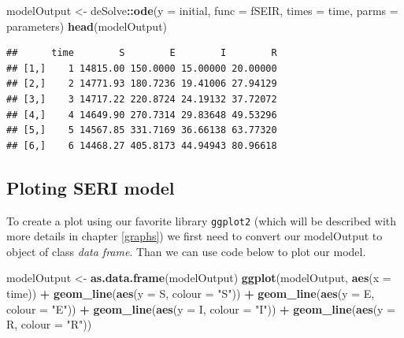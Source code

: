 \documentclass[]{book}
\newenvironment{Shaded}{\begin{snugshade}}{\end{snugshade}}
\newcommand{\KeywordTok}[1]{\textcolor[rgb]{0.13,0.29,0.53}{\textbf{#1}}}
\newcommand{\DataTypeTok}[1]{\textcolor[rgb]{0.13,0.29,0.53}{#1}}
\newcommand{\StringTok}[1]{\textcolor[rgb]{0.31,0.60,0.02}{#1}}
\newcommand{\OperatorTok}[1]{\textcolor[rgb]{0.81,0.36,0.00}{\textbf{#1}}}
\newcommand{\NormalTok}[1]{#1}
\theoremstyle{definition}
\theoremstyle{definition}
\theoremstyle{definition}
\theoremstyle{remark}
\begin{document}
\begin{Shaded}
\begin{Highlighting}[]
\NormalTok{modelOutput <-}\StringTok{ }\NormalTok{deSolve}\OperatorTok{::}\KeywordTok{ode}\NormalTok{(}\DataTypeTok{y =}\NormalTok{ initial, }\DataTypeTok{func =}\NormalTok{ fSEIR, }\DataTypeTok{times =}\NormalTok{ time, }\DataTypeTok{parms =}\NormalTok{ parameters)}
\KeywordTok{head}\NormalTok{(modelOutput)}
\end{Highlighting}
\end{Shaded}

\begin{verbatim}
##      time        S        E        I        R
## [1,]    1 14815.00 150.0000 15.00000 20.00000
## [2,]    2 14771.93 180.7236 19.41006 27.94129
## [3,]    3 14717.22 220.8724 24.19132 37.72072
## [4,]    4 14649.90 270.7314 29.83648 49.53296
## [5,]    5 14567.85 331.7169 36.66138 63.77320
## [6,]    6 14468.27 405.8173 44.94943 80.96618
\end{verbatim}

\subsection{Ploting SERI model}\label{ploting-seri-model}

To create a plot using our favorite library \texttt{ggplot2} (which will
be described with more details in chapter \ref{graphs}) we first need to
convert our modelOutput to object of class \emph{data frame}. Than we
can use code below to plot our model.

\begin{Shaded}
\begin{Highlighting}[]
\NormalTok{modelOutput <-}\StringTok{ }\KeywordTok{as.data.frame}\NormalTok{(modelOutput)}
\KeywordTok{ggplot}\NormalTok{(modelOutput, }\KeywordTok{aes}\NormalTok{(}\DataTypeTok{x =}\NormalTok{ time)) }\OperatorTok{+}
\StringTok{  }\KeywordTok{geom_line}\NormalTok{(}\KeywordTok{aes}\NormalTok{(}\DataTypeTok{y =}\NormalTok{ S, }\DataTypeTok{colour =} \StringTok{"S"}\NormalTok{)) }\OperatorTok{+}\StringTok{ }
\StringTok{  }\KeywordTok{geom_line}\NormalTok{(}\KeywordTok{aes}\NormalTok{(}\DataTypeTok{y =}\NormalTok{ E, }\DataTypeTok{colour =} \StringTok{"E"}\NormalTok{)) }\OperatorTok{+}
\StringTok{  }\KeywordTok{geom_line}\NormalTok{(}\KeywordTok{aes}\NormalTok{(}\DataTypeTok{y =}\NormalTok{ I, }\DataTypeTok{colour =} \StringTok{"I"}\NormalTok{)) }\OperatorTok{+}\StringTok{ }
\StringTok{  }\KeywordTok{geom_line}\NormalTok{(}\KeywordTok{aes}\NormalTok{(}\DataTypeTok{y =}\NormalTok{ R, }\DataTypeTok{colour =} \StringTok{"R"}\NormalTok{))}
\end{Highlighting}
\end{Shaded}
\end{document}
